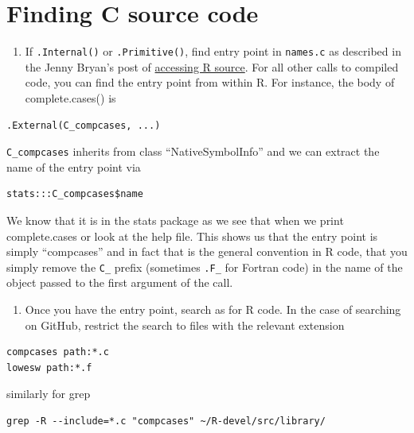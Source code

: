 \documentclass[
]{book}
\providecommand{\tightlist}{%
  \setlength{\itemsep}{0pt}\setlength{\parskip}{0pt}}
\begin{document}
\section{Finding C source code}\label{finding-c-source-code}

\begin{enumerate}
\def\labelenumi{\arabic{enumi}.}
\tightlist
\item
  If \texttt{.Internal()} or \texttt{.Primitive()}, find entry point in \texttt{names.c} as described in the Jenny Bryan's post of \href{https://github.com/jennybc/access-r-source}{accessing R source}. For all other calls to compiled code, you can find the entry point from within R. For instance, the body of complete.cases() is
\end{enumerate}

\begin{verbatim}
.External(C_compcases, ...)
\end{verbatim}

\texttt{C\_compcases} inherits from class ``NativeSymbolInfo'' and we can extract the name of the entry point via

\begin{verbatim}
stats:::C_compcases$name
\end{verbatim}

We know that it is in the stats package as we see that when we print complete.cases or look at the help file. This shows us that the entry point is simply ``compcases'' and in fact that is the general convention in R code, that you simply remove the \texttt{C\_} prefix (sometimes \texttt{.F\_} for Fortran code) in the name of the object passed to the first argument of the call.

\begin{enumerate}
\def\labelenumi{\arabic{enumi}.}
\setcounter{enumi}{1}
\tightlist
\item
  Once you have the entry point, search as for R code. In the case of searching on GitHub, restrict the search to files with the relevant extension
\end{enumerate}

\begin{verbatim}
compcases path:*.c
lowesw path:*.f
\end{verbatim}

similarly for grep

\begin{verbatim}
grep -R --include=*.c "compcases" ~/R-devel/src/library/
\end{verbatim}
\end{document}
